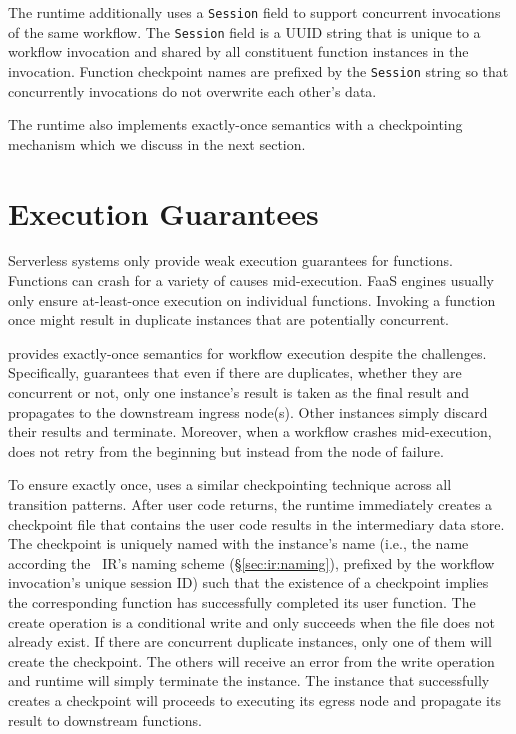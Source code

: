 The runtime additionally uses a \texttt{Session} field to support concurrent
invocations of the same workflow. The \texttt{Session} field is a UUID string
that is unique to a workflow invocation and shared by all constituent function
instances in the invocation. Function checkpoint names are prefixed by the
\texttt{Session} string so that concurrently invocations do not overwrite each
other's data.

The \name{} runtime also implements exactly-once semantics with a
checkpointing mechanism which we discuss in the next section.


\section{Execution Guarantees}

Serverless systems only provide weak execution guarantees for functions.
Functions can crash for a variety of causes mid-execution. FaaS engines
usually only ensure at-least-once execution on individual functions. Invoking
a function once might result in duplicate instances that are potentially
concurrent.

\name{} provides exactly-once semantics for workflow execution despite the
challenges. Specifically, \name{} guarantees that even if there are
duplicates, whether they are concurrent or not, only one instance's result is
taken as the final result and propagates to the downstream ingress node(s).
Other instances simply discard their results and terminate. Moreover, when a
workflow crashes mid-execution, \name{} does not retry from the beginning but
instead from the node of failure.

To ensure exactly once, \name{} uses a similar checkpointing technique across all transition patterns. After user code returns, the \name{}
runtime immediately creates a checkpoint file that contains the user code
results in the intermediary data store. The checkpoint is uniquely named with
the instance's name (i.e., the name according the
\name{}~IR's naming scheme (\S\ref{sec:ir:naming}), prefixed by the workflow
invocation's unique session ID) such that the existence of a checkpoint
implies the corresponding function has successfully completed its user
function. The create operation is a conditional write and only succeeds when
the file does not already exist. If there are concurrent duplicate instances,
only one of them will create the checkpoint. The others will receive an error
from the write operation and \name{} runtime will simply terminate the
instance. The instance that successfully creates a checkpoint will proceeds to
executing its egress node and propagate its result to downstream functions.

